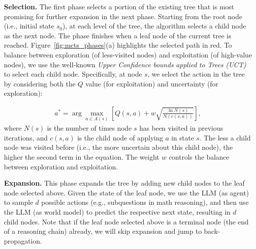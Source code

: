 \noindent \textbf{Selection.}
The first phase selects a portion of the existing tree that is most promising for further expansion in the next phase. Starting from the root node (i.e., initial state $s_0$), at each level of the tree, the algorithm selects a child node as the next node. The phase finishes when a leaf node of the current tree is reached. Figure~\ref{fig:mcts_phases}(a) highlights the selected path in red. To balance between exploration (of less-visited nodes) and exploitation (of high-value nodes), we use the well-known \emph{Upper Confidence bounds applied to Trees (UCT)} \cite{kocsis2006bandit} to select each child node. Specifically, at node $s$, we select the action in the tree by considering both the $Q$ value (for exploitation) and uncertainty (for exploration):

\vspace{-8pt}
{
\small
\begin{align}
    a^\ast = \arg\max_{a \in A(s)} \left[ Q(s, a) + w \sqrt{\frac{\ln N(s)}{N(c(s, a))}} \right],
\end{align}
}
\noindent where $N(s)$ is the number of times node $s$ has been visited in previous iterations, and $c(s, a)$ is the child node of applying $a$ in state $s$. The less a child node was visited before (i.e., the more uncertain about this child node), the higher the second term in the equation. The weight $w$ controls the balance between exploration and exploitation.


\noindent \textbf{Expansion.}
This phase expands the tree by adding new child nodes to the leaf node selected above. Given the state of the leaf node, we use the LLM (as agent) to sample $d$ possible actions (e.g., subquestions in math reasoning), and then use the LLM (as world model) to predict the respective next state, resulting in $d$ child nodes. Note that if the leaf node selected above is a terminal node (the end of a reasoning chain) already, we will skip expansion and jump to back-propagation.

